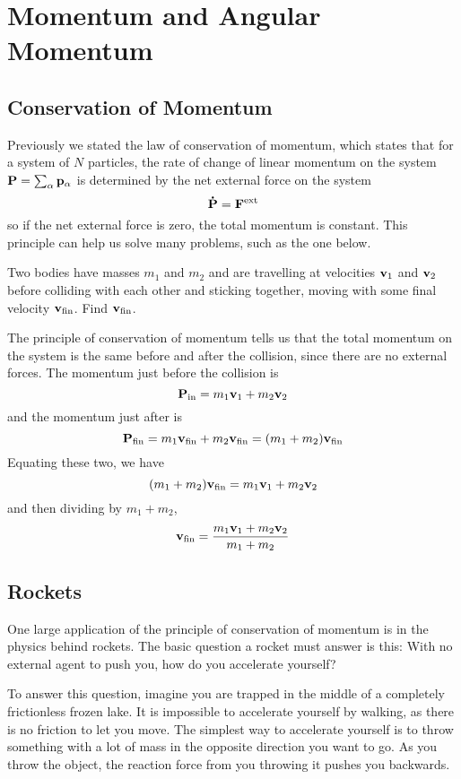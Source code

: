 \chapter{Momentum and Angular Momentum}
\section{Conservation of Momentum}
Previously we stated the law of conservation of momentum, which states that for a system of $N$ particles, the rate of change of linear momentum on the system $\mathbf{P} = \sum_\alpha \mathbf{p}_\alpha$ is determined by the net external force on the system
\[ \mathbf{\dot P} = \mathbf{F}^{\text{ext}} \]
so if the net external force is zero, the total momentum is constant. This principle can help us solve many problems, such as the one below.
\begin{example}
    Two bodies have masses $m_1$ and $m_2$ and are travelling at velocities $\mathbf{v}_1$ and $\mathbf{v}_2$ before colliding with each other and sticking together, moving with some final velocity $\mathbf{v}_\text{fin}$. Find $\mathbf{v}_\text{fin}$. 

    The principle of conservation of momentum tells us that the total momentum on the system is the same before and after the collision, since there are no external forces. The momentum just before the collision is
    \[ \mathbf{P}_{\text{in}} = m_1\mathbf{v}_1 + m_2\mathbf{v}_2 \]
    and the momentum just after is
    \[ \mathbf{P}_{\text{fin}} = m_1\mathbf{v}_\text{fin} + m_2\mathbf{v}_\text{fin} = (m_1 + m_2)\mathbf{v}_\text{fin}\]
    Equating these two, we have
    \[ (m_1+m_2)\mathbf{v}_\text{fin} = m_1\mathbf{v}_1 + m_2\mathbf{v}_2 \]
    and then dividing by $m_1+m_2$,
    \[ \mathbf{v}_\text{fin} = \frac{m_1\mathbf{v}_1 + m_2\mathbf{v}_2}{m_1+m_2}\]
\end{example}
\section{Rockets}
One large application of the principle of conservation of momentum is in the physics behind rockets. The basic question a rocket must answer is this: With no external agent to push you, how do you accelerate yourself? 

To answer this question, imagine you are trapped in the middle of a completely frictionless frozen lake. It is impossible to accelerate yourself by walking, as there is no friction to let you move. The simplest way to accelerate yourself is to throw something with a lot of mass in the opposite direction you want to go. As you throw the object, the reaction force from you throwing it pushes you backwards.

